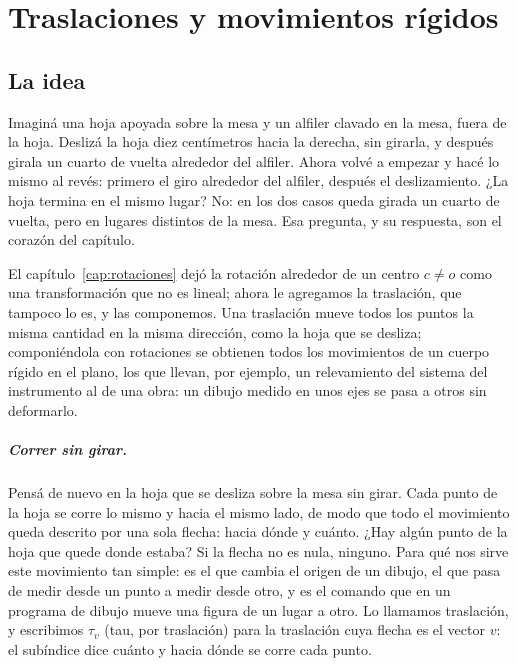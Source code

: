 \chapter{Traslaciones y movimientos rígidos}\label{cap:traslaciones}

\section{La idea}

Imaginá una hoja apoyada sobre la mesa y un alfiler clavado en la mesa, fuera de la hoja.
Deslizá la hoja diez centímetros hacia la derecha, sin girarla, y después girala un cuarto de
vuelta alrededor del alfiler. Ahora volvé a empezar y hacé lo mismo al revés: primero el giro
alrededor del alfiler, después el deslizamiento. ¿La hoja termina en el mismo lugar? No: en los
dos casos queda girada un cuarto de vuelta, pero en lugares distintos de la mesa. Esa pregunta,
y su respuesta, son el corazón del capítulo.

El capítulo~\ref{cap:rotaciones} dejó la rotación alrededor de un centro \(c\neq o\) como una
transformación que no es lineal; ahora le agregamos la traslación, que tampoco lo es, y las
componemos. Una traslación mueve todos los puntos la misma cantidad en la misma dirección, como
la hoja que se desliza;
componiéndola con rotaciones se obtienen todos los movimientos de un cuerpo rígido en el plano,
los que llevan, por ejemplo, un relevamiento del sistema del instrumento al de una obra: un
dibujo medido en unos ejes se pasa a otros sin deformarlo.

\paragraph{Correr sin girar.}
Pensá de nuevo en la hoja que se desliza sobre la mesa sin girar. Cada punto de la hoja se
corre lo mismo y hacia el mismo lado, de modo que todo el movimiento queda descrito por una
sola flecha: hacia dónde y cuánto. ¿Hay algún punto de la hoja que quede donde estaba? Si la
flecha no es nula, ninguno. Para qué nos sirve este movimiento tan simple: es el que cambia el
origen de un dibujo, el que pasa de medir desde un punto a medir desde otro, y es el comando
que en un programa de dibujo mueve una figura de un lugar a otro. Lo llamamos traslación, y
escribimos \(\tau_v\) (tau, por traslación) para la traslación cuya flecha es el vector \(v\):
el subíndice dice cuánto y hacia dónde se corre cada punto.

